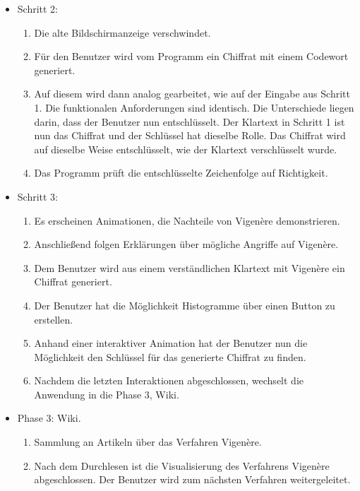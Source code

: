 \documentclass{article}
\begin{document}
\begin{itemize}[label={}]
 \item Schritt 2:

	\begin{enumerate}
	 \item Die alte Bildschirmanzeige verschwindet.
	 \item Für den Benutzer wird vom Programm ein Chiffrat mit einem Codewort generiert. 
	 \item[] Auf diesem wird dann analog gearbeitet, wie auf der Eingabe aus Schritt 1. Die 
	         funktionalen Anforderungen sind identisch. Die Unterschiede liegen darin, dass der Benutzer 
                 nun entschlüsselt. Der Klartext in Schritt 1 ist nun das Chiffrat und der Schlüssel hat 
                 dieselbe Rolle. Das Chiffrat wird auf dieselbe Weise entschlüsselt, wie der Klartext verschlüsselt wurde. 
	 \item Das Programm prüft die entschlüsselte Zeichenfolge auf Richtigkeit.
	\end{enumerate}
	
 \item Schritt 3:
 
	\begin{enumerate}
         \item Es erscheinen Animationen, die Nachteile von Vigenère demonstrieren.
         \item Anschließend folgen Erklärungen über mögliche Angriffe auf Vigenère.
         \item Dem Benutzer wird aus einem verständlichen Klartext mit Vigenère ein Chiffrat generiert.
         \item Der Benutzer hat die Möglichkeit Histogramme über einen Button zu erstellen.
         \item Anhand einer interaktiver Animation hat der Benutzer nun die Möglichkeit den Schlüssel für das generierte Chiffrat zu finden.
         \item Nachdem die letzten Interaktionen abgeschlossen, wechselt die Anwendung in die Phase 3, Wiki.
        \end{enumerate}
	
 \item Phase 3: Wiki.

	\begin{enumerate}
	 \item Sammlung an Artikeln über das Verfahren Vigenère.
	 \item Nach dem Durchlesen ist die Visualisierung des Verfahrens Vigenère abgeschlossen. Der Benutzer wird zum nächsten Verfahren weitergeleitet.
 	\end{enumerate}

\end{itemize}
\end{document}
